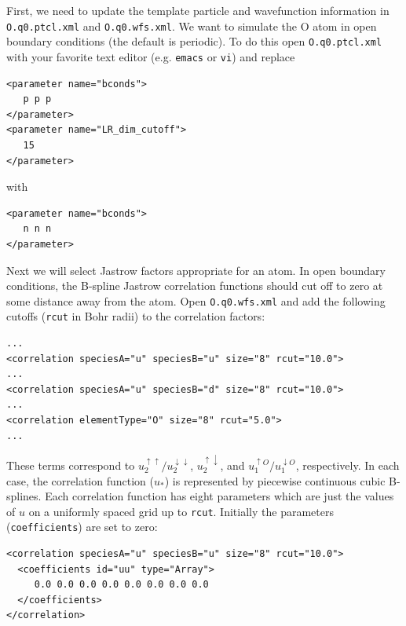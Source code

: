 First, we need to update the template particle and wavefunction information in \texttt{O.q0.ptcl.xml} and \texttt{O.q0.wfs.xml}.  We want to simulate the O atom in open boundary conditions (the default is periodic).  To do this open \texttt{O.q0.ptcl.xml} with your favorite text editor (e.g. \texttt{emacs} or \texttt{vi}) and replace
\begin{lstlisting}
<parameter name="bconds">
   p p p
</parameter>
<parameter name="LR_dim_cutoff">
   15
</parameter>
\end{lstlisting}
with
\begin{lstlisting}
<parameter name="bconds">
   n n n 
</parameter>
\end{lstlisting}

Next we will select Jastrow factors appropriate for an atom.  In open boundary conditions, the B-spline Jastrow correlation functions should cut off to zero at some distance away from the atom.  Open \texttt{O.q0.wfs.xml} and add the following cutoffs (\texttt{rcut} in Bohr radii) to the correlation factors:
\begin{lstlisting}
...
<correlation speciesA="u" speciesB="u" size="8" rcut="10.0">
...
<correlation speciesA="u" speciesB="d" size="8" rcut="10.0">
...
<correlation elementType="O" size="8" rcut="5.0">
...
\end{lstlisting}
\noindent
These terms correspond to $u_2^{\uparrow\uparrow}/u_2^{\downarrow\downarrow}$, $u_2^{\uparrow\downarrow}$, and $u_1^{\uparrow O}/u_1^{\downarrow O}$, respectively.  In each case, the correlation function ($u_*$) is represented by piecewise continuous cubic B-splines.  Each correlation function has eight parameters which are just the values of $u$ on a uniformly spaced grid up to \texttt{rcut}.  Initially the parameters (\texttt{coefficients}) are set to zero:
\begin{lstlisting}
<correlation speciesA="u" speciesB="u" size="8" rcut="10.0">
  <coefficients id="uu" type="Array">
     0.0 0.0 0.0 0.0 0.0 0.0 0.0 0.0
  </coefficients>
</correlation>
\end{lstlisting}

